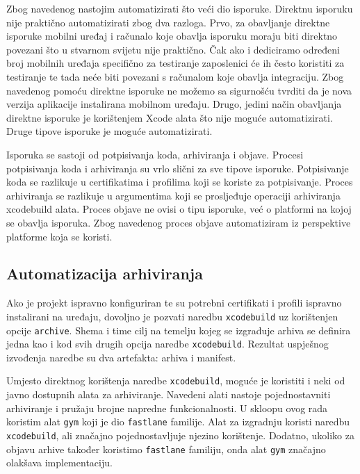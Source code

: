 \documentclass[times, utf8, diplomski, numeric]{fer}
\begin{document}
Zbog navedenog nastojim automatizirati što veći dio isporuke. Direktnu isporuku nije praktično automatizirati zbog dva razloga. Prvo, za obavljanje direktne isporuke mobilni uređaj i računalo koje obavlja isporuku moraju biti direktno povezani što u stvarnom svijetu nije praktično. Čak ako i dediciramo određeni broj mobilnih uređaja specifično za testiranje zaposlenici će ih često koristiti za testiranje te tada neće biti povezani s računalom koje obavlja integraciju. Zbog navedenog pomoću direktne isporuke ne možemo sa sigurnošću tvrditi da je nova verzija aplikacije instalirana mobilnom uređaju. Drugo, jedini način obavljanja direktne isporuke je korištenjem Xcode alata što nije moguće automatizirati. Druge tipove isporuke je moguće automatizirati.

Isporuka se sastoji od potpisivanja koda, arhiviranja i objave. Procesi potpisivanja koda i arhiviranja su vrlo slični za sve tipove isporuke. Potpisivanje koda se razlikuje u  certifikatima i profilima koji se koriste za potpisivanje. Proces arhiviranja se razlikuje u argumentima koji se prosljeđuje operaciji arhiviranja xcodebuild alata. Proces objave ne ovisi o tipu isporuke, već o platformi na kojoj se obavlja isporuka. Zbog navedenog proces objave automatiziram iz perspektive platforme koja se koristi.


\subsection{Automatizacija arhiviranja}

Ako je projekt ispravno konfiguriran te su potrebni certifikati i profili ispravno instalirani na uređaju, dovoljno je pozvati naredbu \verb|xcodebuild| uz korištenjen opcije \verb|archive|. Shema i time cilj na temelju kojeg se izgrađuje arhiva se definira jedna kao i kod svih drugih opcija naredbe \verb|xcodebuild|. Rezultat uspješnog izvođenja naredbe su dva artefakta: arhiva i manifest.

Umjesto direktnog korištenja naredbe \verb|xcodebuild|, moguće je koristiti i neki od javno dostupnih alata za arhiviranje. Navedeni alati nastoje pojednostavniti arhiviranje i pružaju brojne napredne funkcionalnosti. U skloopu ovog rada koristim alat \verb|gym| koji je dio \verb|fastlane| familije. Alat za izgradnju koristi naredbu \verb|xcodebuild|, ali značajno pojednostavljuje njezino korištenje. Dodatno, ukoliko za objavu arhive također koristimo \verb|fastlane| familiju, onda alat \verb|gym| značajno olakšava implementaciju.
\end{document}
